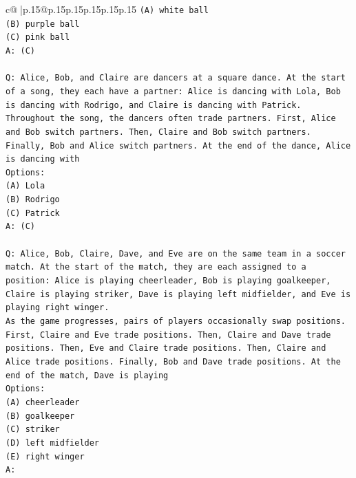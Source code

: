 \documentclass{article}
\begin{document}
{\begin{supertabular}{c@{$\;$}|p{.15\linewidth}@{}p{.15\linewidth}p{.15\linewidth}p{.15\linewidth}p{.15\linewidth}p{.15\linewidth}}
{{{\texttt{(A) white ball} \\
\texttt{(B) purple ball} \\
\texttt{(C) pink ball} \\
\texttt{A: (C)} \\
\\ 
\texttt{Q: Alice, Bob, and Claire are dancers at a square dance. At the start of a song, they each have a partner: Alice is dancing with Lola, Bob is dancing with Rodrigo, and Claire is dancing with Patrick.} \\
\texttt{Throughout the song, the dancers often trade partners. First, Alice and Bob switch partners. Then, Claire and Bob switch partners. Finally, Bob and Alice switch partners. At the end of the dance, Alice is dancing with} \\
\texttt{Options:} \\
\texttt{(A) Lola} \\
\texttt{(B) Rodrigo} \\
\texttt{(C) Patrick} \\
\texttt{A: (C)} \\
\\ 
\texttt{Q: Alice, Bob, Claire, Dave, and Eve are on the same team in a soccer match. At the start of the match, they are each assigned to a position: Alice is playing cheerleader, Bob is playing goalkeeper, Claire is playing striker, Dave is playing left midfielder, and Eve is playing right winger.} \\
\texttt{As the game progresses, pairs of players occasionally swap positions. First, Claire and Eve trade positions. Then, Claire and Dave trade positions. Then, Eve and Claire trade positions. Then, Claire and Alice trade positions. Finally, Bob and Dave trade positions. At the end of the match, Dave is playing} \\
\texttt{Options:} \\
\texttt{(A) cheerleader} \\
\texttt{(B) goalkeeper} \\
\texttt{(C) striker} \\
\texttt{(D) left midfielder} \\
\texttt{(E) right winger} \\
\texttt{A:} \\
            }
        }
    }
     \\ \\


\end{supertabular}}
\end{document}
